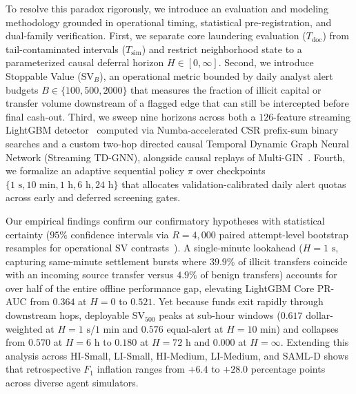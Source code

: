 \documentclass[pdflatex,sn-mathphys,Numbered]{sn-jnl}
\theoremstyle{thmstyleone}
\begin{document}
To resolve this paradox rigorously, we introduce an evaluation and modeling methodology grounded in operational timing, statistical pre-registration, and dual-family verification. First, we separate core laundering evaluation ($T_{\text{doc}}$) from tail-contaminated intervals ($T_{\text{sim}}$) and restrict neighborhood state to a parameterized causal deferral horizon $H \in [0, \infty]$. Second, we introduce Stoppable Value ($\text{SV}_B$), an operational metric bounded by daily analyst alert budgets $B \in \{100, 500, 2000\}$ that measures the fraction of illicit capital or transfer volume downstream of a flagged edge that can still be intercepted before final cash-out. Third, we sweep nine horizons across both a $126$-feature streaming LightGBM detector~\cite{ke2017lightgbm} computed via Numba-accelerated CSR prefix-sum binary searches and a custom two-hop directed causal Temporal Dynamic Graph Neural Network (Streaming TD-GNN), alongside causal replays of Multi-GIN~\cite{egressy2024multigraph}. Fourth, we formalize an adaptive sequential policy $\pi$ over checkpoints $\{1\text{ s}, 10\text{ min}, 1\text{ h}, 6\text{ h}, 24\text{ h}\}$ that allocates validation-calibrated daily alert quotas across early and deferred screening gates.

Our empirical findings confirm our confirmatory hypotheses with statistical certainty ($95\%$ confidence intervals via $R = 4{,}000$ paired attempt-level bootstrap resamples for operational $\text{SV}$ contrasts~\cite{efron1993bootstrap}). A single-minute lookahead ($H = 1\text{ s}$, capturing same-minute settlement bursts where $39.9\%$ of illicit transfers coincide with an incoming source transfer versus $4.9\%$ of benign transfers) accounts for over half of the entire offline performance gap, elevating LightGBM Core PR-AUC from $0.364$ at $H = 0$ to $0.521$. Yet because funds exit rapidly through downstream hops, deployable $\text{SV}_{500}$ peaks at sub-hour windows ($0.617$ dollar-weighted at $H = 1\text{ s}$/$1\text{ min}$ and $0.576$ equal-alert at $H = 10\text{ min}$) and collapses from $0.570$ at $H = 6\text{ h}$ to $0.180$ at $H = 72\text{ h}$ and $0.000$ at $H = \infty$. Extending this analysis across HI-Small, LI-Small, HI-Medium, LI-Medium, and SAML-D shows that retrospective $F_1$ inflation ranges from $+6.4$ to $+28.0$ percentage points across diverse agent simulators.
\end{document}
